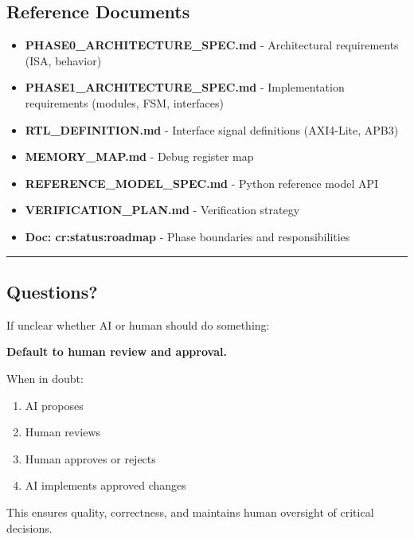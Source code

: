 \subsection{Reference Documents}\label{cr:status:phase1-ai-human-responsibilities:reference-documents}

\begin{record}

\begin{itemize}
\tightlist
\item
  \textbf{PHASE0\_\allowbreak{}ARCHITECTURE\_\allowbreak{}SPEC.md} -
  Architectural requirements (ISA, behavior)
\item
  \textbf{PHASE1\_\allowbreak{}ARCHITECTURE\_\allowbreak{}SPEC.md} -
  Implementation requirements (modules, FSM, interfaces)
\item
  \textbf{RTL\_\allowbreak{}DEFINITION.md} - Interface signal
  definitions (AXI4-Lite, APB3)
\item
  \textbf{MEMORY\_\allowbreak{}MAP.md} - Debug register map
\item
  \textbf{REFERENCE\_\allowbreak{}MODEL\_\allowbreak{}SPEC.md} - Python
  reference model API
\item
  \textbf{VERIFICATION\_\allowbreak{}PLAN.md} - Verification strategy
\item
  \textbf{Doc: cr:status:roadmap} - Phase boundaries and
  responsibilities
\end{itemize}

\begin{center}\rule{0.5\linewidth}{0.5pt}\end{center}

\end{record}

\subsection{Questions?}\label{cr:status:phase1-ai-human-responsibilities:questions}

\begin{record}

If unclear whether AI or human should do something:

\textbf{Default to human review and approval.}

When in doubt:

\begin{enumerate}
\def\labelenumi{\arabic{enumi}.}
\tightlist
\item
  AI proposes
\item
  Human reviews
\item
  Human approves or rejects
\item
  AI implements approved changes
\end{enumerate}

This ensures quality, correctness, and maintains human oversight of
critical decisions.

\end{record}

